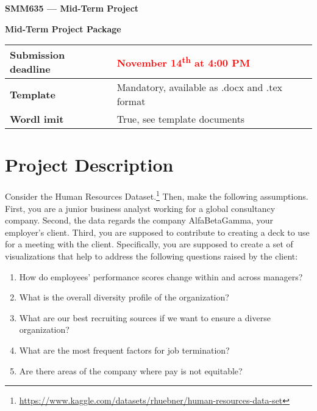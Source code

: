 \documentclass[11pt]{article}
\begin{document}
\begin{center}
	\textbf{\LARGE SMM635 --- Mid-Term Project}
	
	\vspace{1em}
	
	\textbf{\LARGE Mid-Term Project Package}
	
	\vspace{10em}
	
	\begin{table}[!htbp]
		\begin{small}
			\begin{center}
				\begin{tabular}[c]{|l|l|}
					\hline
					\textbf{Submission deadline} &
					\textcolor{red}{November 14\textsuperscript{th} at 4:00 PM} \\
					\hline
					\textbf{Template} & Mandatory, available as .docx and .tex format\\
					\hline
					\textbf{Wordl imit} & True, see template documents\\
					\hline
				\end{tabular}
			\end{center}
		\end{small}
	\end{table}
	
	
\end{center}

\clearpage

\section{Project Description}

Consider the Human Resources
Dataset.\footnote{\url{https://www.kaggle.com/datasets/rhuebner/human-resources-data-set}}
Then, make the following assumptions. First, you are a junior business analyst
working for a global consultancy company. Second, the data regards the company
AlfaBetaGamma, your employer's client. Third, you are supposed to contribute to
creating a deck to use for a meeting with the client. Specifically,  you are
supposed to create a set of visualizations that help to address the following
questions raised by the client:

\begin{enumerate}
	\item How do employees' performance scores change within and across managers? 
	\item What is the overall diversity profile of the organization?
	\item What are our best recruiting sources if we want to ensure a diverse organization?
	\item What are the most frequent factors for job termination?
	\item Are there areas of the company where pay is not equitable?
\end{enumerate}
\end{document}
